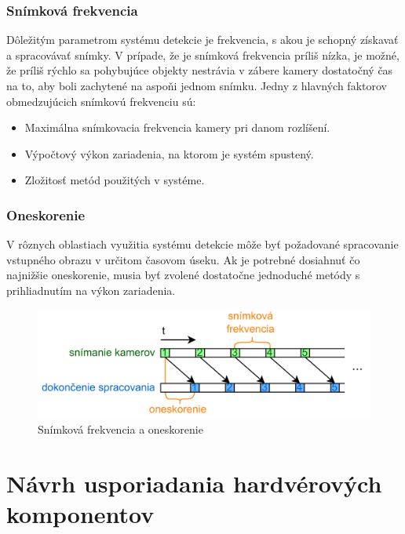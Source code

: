         \subsection{Snímková frekvencia}
            Dôležitým parametrom systému detekcie je frekvencia, s akou je schopný získavať a spracovávať snímky. V prípade, že je snímková frekvencia príliš nízka, je možné, že príliš rýchlo sa pohybujúce objekty nestrávia v zábere kamery dostatočný čas na to, aby boli zachytené na aspoňi jednom snímku. Jedny z hlavných faktorov obmedzujúcich snímkovú frekvenciu sú:
            \begin{itemize}
                \item Maximálna snímkovacia frekvencia kamery pri danom rozlíšení.
                \item Výpočtový výkon zariadenia, na ktorom je systém spustený.
                \item Zložitosť metód použitých v systéme.
            \end{itemize}

        \subsection{Oneskorenie}
            V rôznych oblastiach využitia systému detekcie môže byť požadované spracovanie vstupného obrazu v určitom časovom úseku. Ak je potrebné dosiahnuť čo najnižšie oneskorenie, musia byť zvolené dostatočne jednoduché metódy s prihliadnutím na výkon zariadenia.

        \begin{figure}[!ht]
            \begin{center}
                \includegraphics[width=.8\textwidth]{obrazky/metrics/fps_latency.drawio.png}
            \end{center}
            \caption{Snímková frekvencia a oneskorenie}
        \end{figure}

\chapter{Návrh usporiadania hardvérových komponentov}

